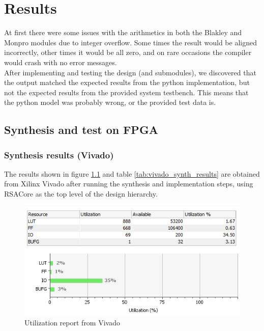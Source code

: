 \chapter{Results}
At first there were some issues with the arithmetics in both the Blakley and Monpro modules due to integer overflow. Some times the result would be aligned incorrectly, other times it would be all zero, and on rare occasions the compiler would crash with no error messages.\\

After implementing and testing the design (and submodules), we discovered that the output matched the expected results from the python implementation, but not the expected results from the provided system testbench. This means that the python model was probably wrong, or the provided test data is.

\section{Synthesis and test on FPGA}
\subsection{Synthesis results (Vivado)}
The results shown in figure \ref{fig:utilization} and table \ref{tab:vivado_synth_results} are obtained from Xilinx Vivado after running the synthesis and implementation steps, using RSACore as the top level of the design hierarchy.
\begin{figure}[H]
\centering
\includegraphics[width=\textwidth]{images/Vivado_utilization}
\caption{Utilization report from Vivado}
\label{fig:utilization}
\end{figure}

